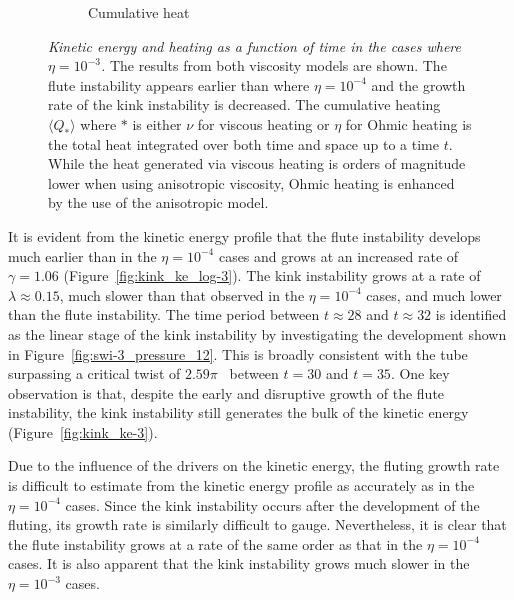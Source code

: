 \documentclass[fleqn,usenatbib]{mnras}
\newcommand{\rev}[1]{{\color{red} {#1}}}
\newcommand{\mycaption}[2]{\caption[#1]{\emph{#1} #2}}
\begin{document}
\begin{figure}
\begin{subfigure}{0.32\textwidth}
      \caption{Cumulative heat}
      \label{fig:heating_r-3}
    \end{subfigure}
\mycaption{Kinetic energy \rev{and heating} as a function of time in the cases where
$\eta=10^{-3}$.}{The results from both viscosity models are shown. The flute
instability appears earlier than where $\eta=10^{-4}$ and the growth rate of
the kink instability is decreased. \rev{The cumulative heating $\langle Q_{*} \rangle$ where $*$ is either $\nu$ for viscous heating or $\eta$ for Ohmic heating is the total heat integrated over both time and space up to a time $t$. While the heat generated via viscous heating is orders of magnitude lower when using anisotropic viscosity, Ohmic heating is enhanced by the use of the anisotropic model.}}
\label{fig:kink_str8_ke-3}%
\end{figure}

It is evident from the kinetic energy profile that the flute instability
develops much earlier than in the $\eta=10^{-4}$ cases and grows at an
increased rate of $\gamma = 1.06$ (Figure~\ref{fig:kink_ke_log-3}). The kink
instability grows at a rate of $\lambda \approx 0.15$, much slower than that
observed in the $\eta=10^{-4}$ cases, and much lower than the flute
instability. \rev{The time period between $t\approx28$ and $t\approx32$ is
identified as the linear stage of the kink instability by investigating the
development shown in Figure~\ref{fig:swi-3_pressure_12}. This is broadly
consistent with the tube surpassing a critical twist of
$2.59\pi$~\citep{hood1981,Torok2003} between $t=30$ and $t=35$.} One key
observation is that, despite the early and disruptive growth of the flute
instability, the kink instability still generates the bulk of the kinetic
energy (Figure~\ref{fig:kink_ke-3}).

Due to the influence of the drivers on the kinetic energy, the fluting growth
rate is difficult to estimate from the kinetic energy profile as accurately as
in the $\eta=10^{-4}$ cases. Since the kink instability occurs after the
development of the fluting, its growth rate is similarly difficult to gauge.
Nevertheless, it is clear that the flute instability grows at a rate of the
same order as that in the $\eta=10^{-4}$ cases. It is also apparent that the
kink instability grows much slower in the $\eta=10^{-3}$ cases.
\end{document}
